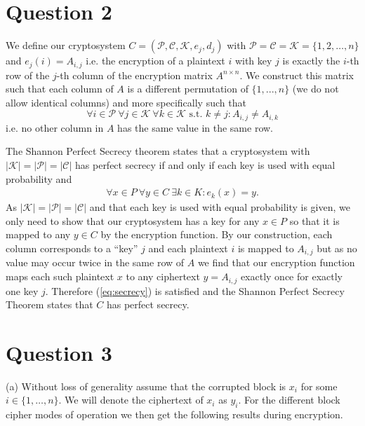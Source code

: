 \documentclass[11pt]{article}
\begin{document}
\section*{Question 2}

We define our cryptosystem $C = (\mathcal{P},\mathcal{C},\mathcal{K},e_j,d_j)$ with $\mathcal{P}=\mathcal{C}=\mathcal{K}=\{1,2,\ldots,n \}$ and $e_j(i)=A_{i,j}$ i.e. the encryption of a plaintext $i$ with key $j$ is exactly the $i$-th row of the $j$-th column of the encryption matrix $A^{n \times n}$. We construct this matrix such that each column of $A$ is a different permutation of $\{1,...,n\}$ (we do not allow identical columns) and more specifically such that
$$
\forall i \in \mathcal{P} \ \forall j \in \mathcal{K} \ \forall k \in \mathcal{K} \text{ s.t. } k \neq j: A_{i,j} \neq A_{i,k}
$$
i.e. no other column in $A$ has the same value in the same row.

The Shannon Perfect Secrecy theorem states that a cryptosystem with $|\mathcal{K}| = |\mathcal{P}| = |\mathcal{C}|$ has perfect secrecy if and only if each key is used with equal probability and 
\begin{align} \label{eq:secrecy}
    \forall x \in P \ \forall y \in C \ \exists k \in K: e_k(x) = y.
\end{align}
As $|\mathcal{K}| = |\mathcal{P}| = |\mathcal{C}|$ and that each key is used with equal probability is given, we only need to show that our cryptosystem has a key for any $x \in P$ so that it is mapped to any $y \in C$ by the encryption function. By our construction, each column corresponds to a ``key'' $j$ and each plaintext $i$ is mapped to $A_{i,j}$ but as no value may occur twice in the same row of $A$ we find that our encryption function maps each such plaintext $x$ to any ciphertext $y = A_{i,j}$ exactly once for exactly one key $j$. Therefore (\ref{eq:secrecy}) is satisfied and the Shannon Perfect Secrecy Theorem states that $C$ has perfect secrecy.

\section*{Question 3}

(a) Without loss of generality assume that the corrupted block is $x_i$ for some $i \in \{1, \ldots, n\}$. We will denote the ciphertext of $x_i$ as $y_i$. For the different block cipher modes of operation we then get the following results during encryption.
\end{document}
